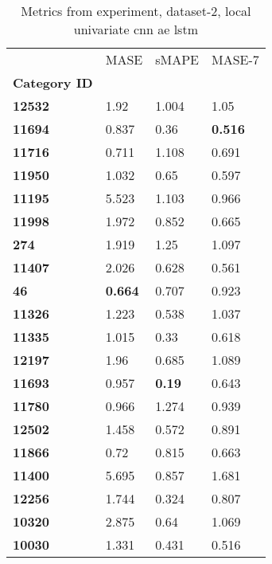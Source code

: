 \begin{table}[H]
\centering
\caption{Metrics from experiment, dataset-2, local univariate cnn ae lstm}
\label{table:local-univariate-cnn-ae-lstm-dataset-2}
\begin{tabular}{llll}
\toprule
{} &            MASE &          sMAPE &          MASE-7 \\
\textbf{Category ID} &                 &                &                 \\
\midrule
\textbf{12532      } &            1.92 &          1.004 &            1.05 \\
\textbf{11694      } &           0.837 &           0.36 &  \textbf{0.516} \\
\textbf{11716      } &           0.711 &          1.108 &           0.691 \\
\textbf{11950      } &           1.032 &           0.65 &           0.597 \\
\textbf{11195      } &           5.523 &          1.103 &           0.966 \\
\textbf{11998      } &           1.972 &          0.852 &           0.665 \\
\textbf{274        } &           1.919 &           1.25 &           1.097 \\
\textbf{11407      } &           2.026 &          0.628 &           0.561 \\
\textbf{46         } &  \textbf{0.664} &          0.707 &           0.923 \\
\textbf{11326      } &           1.223 &          0.538 &           1.037 \\
\textbf{11335      } &           1.015 &           0.33 &           0.618 \\
\textbf{12197      } &            1.96 &          0.685 &           1.089 \\
\textbf{11693      } &           0.957 &  \textbf{0.19} &           0.643 \\
\textbf{11780      } &           0.966 &          1.274 &           0.939 \\
\textbf{12502      } &           1.458 &          0.572 &           0.891 \\
\textbf{11866      } &            0.72 &          0.815 &           0.663 \\
\textbf{11400      } &           5.695 &          0.857 &           1.681 \\
\textbf{12256      } &           1.744 &          0.324 &           0.807 \\
\textbf{10320      } &           2.875 &           0.64 &           1.069 \\
\textbf{10030      } &           1.331 &          0.431 &           0.516 \\
\bottomrule
\end{tabular}
\end{table}
